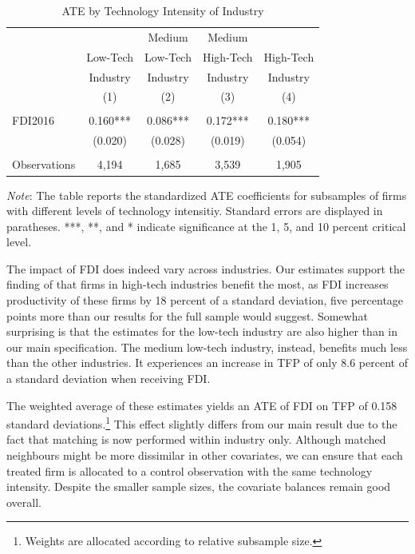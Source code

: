 \documentclass[a4paper,11pt]{scrartcl}
\begin{document}
\begin{table}[h!]
  \centering
   \caption{ATE by Technology Intensity of Industry}
   \label{tab:TECH}
\begin{threeparttable}
 
\begin{tabular}{lcccc}
 \hline
 \hline
 & & Medium & Medium &  \\ 
 & Low-Tech & Low-Tech & High-Tech & High-Tech \\ 
 & Industry & Industry & Industry & Industry \\ 
 & (1) & (2) & (3) & (4) \\
 \hline
 &  &  &  &  \\
FDI2016 & 0.160*** & 0.086*** & 0.172*** & 0.180*** \\
	      & (0.020) & (0.028) & (0.019) & (0.054) \\
	      &  &  &  &  \\
 Observations & 4,194 & 1,685 & 3,539 & 1,905 \\ 
	\hline
	\hline
\end{tabular}	

\begin{tablenotes}[flushleft]
     \footnotesize       
\item \textit{Note}: The table reports the standardized ATE coefficients for subsamples of firms with different levels of technology intensitiy. Standard errors are displayed in paratheses. ***, **, and * indicate significance at the 1, 5, and 10 percent critical level. 

\end{tablenotes}


\end{threeparttable}
\end{table}

The impact of FDI does indeed vary across industries. Our estimates support the finding of \citet{Keller2009} that firms in high-tech industries benefit the most, as FDI increases productivity of these firms by 18 percent of a standard deviation, five percentage points more than our results for the full sample would suggest. Somewhat surprising is that the estimates for the low-tech industry are also higher than in our main specification. The medium low-tech industry, instead, benefits much less than the other industries. It experiences an increase in TFP of only 8.6 percent of a standard deviation when receiving FDI. 

The weighted average of these estimates yields an ATE of FDI on TFP of 0.158 standard deviations.\footnote{Weights are allocated according to relative subsample size.} This effect slightly differs from our main result due to the fact that matching is now performed within industry only. Although matched neighbours might be more dissimilar in other covariates, we can ensure that each treated firm is allocated to a control observation with the same technology intensity. Despite the smaller sample sizes, the covariate balances remain good overall. \\
\end{document}
